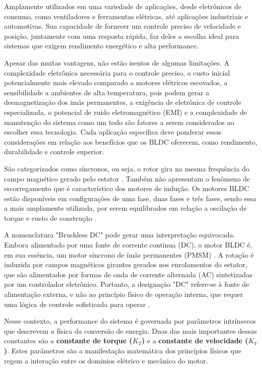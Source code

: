 \documentclass[12pt, a4paper, openright, oneside, brazilian]{abntex2}
\begin{document}
Amplamente utilizados em uma variedade de aplicações, desde eletrônicos de consumo, como ventiladores e ferramentas elétricas, até aplicações industriais e automotivas. Sua capacidade de fornecer um controle preciso de velocidade e posição, juntamente com uma resposta rápida, faz deles a escolha ideal para sistemas que exigem rendimento energético e alta performance.

Apesar das muitas vantagens, não estão isentos de algumas limitações. A complexidade eletrônica necessária para o controle preciso, o custo inicial potencialmente mais elevado comparado a motores elétricos escovados, a sensibilidade a ambientes de alta temperatura, pois podem gerar a desmagnetização dos imãs permanentes, a exigência de eletrônica de controle especializada, o potencial de ruído eletromagnético (EMI) e a complexidade de manutenção do sistema como um todo são fatores a serem considerados ao escolher essa tecnologia. Cada aplicação específica deve ponderar essas considerações em relação aos benefícios que os BLDC oferecem, como rendimento, durabilidade e controle superior.

São categorizados como síncronos, ou seja, o rotor gira na mesma frequência do campo magnético gerado pelo estator \cite{jahns1984torque}. Também não apresentam o fenômeno de escorregamento que é característico dos motores de indução. Os motores BLDC estão disponíveis em configurações de uma fase, duas fases e três fases, sendo  essa a mais amplamente utilizada, por serem equilibrados em relação a oscilação de torque e custo de construção \cite{hendershot1994design}.

A nomenclatura "Brushless DC" pode gerar uma interpretação equivocada. Embora alimentado por uma fonte de corrente contínua (DC), o motor BLDC é, em sua essência, um motor síncrono de ímãs permanentes (PMSM) \parencite{maquinasEletricasFitzgerald}. A rotação é induzida por campos magnéticos girantes gerados nos enrolamentos do estator, que são alimentados por formas de onda de corrente alternada (AC) sintetizadas por um controlador eletrônico. Portanto, a designação "DC" refere-se à fonte de alimentação externa, e não ao princípio físico de operação interna, que requer uma lógica de controle sofisticada para operar \parencite{ti2013sensorless}.

Nesse contexto, a performance do sistema é governada por parâmetros intrínsecos que descrevem a física da conversão de energia. Duas das mais importantes dessas constantes são a \textbf{constante de torque ($K_T$)} e a \textbf{constante de velocidade ($K_V$)}. Estes parâmetros são a manifestação matemática dos princípios físicos que regem a interação entre os domínios elétrico e mecânico do motor.
\end{document}
